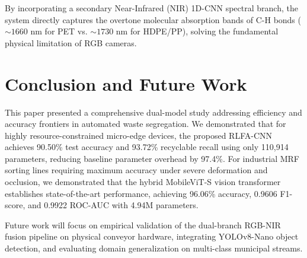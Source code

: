 \documentclass[conference]{IEEEtran}
\begin{document}
By incorporating a secondary Near-Infrared (NIR) 1D-CNN spectral branch, the system directly captures the overtone molecular absorption bands of $\text{C-H}$ bonds ($\sim 1660\text{ nm}$ for PET vs. $\sim 1730\text{ nm}$ for HDPE/PP), solving the fundamental physical limitation of RGB cameras.

\section{Conclusion and Future Work}
This paper presented a comprehensive dual-model study addressing efficiency and accuracy frontiers in automated waste segregation. We demonstrated that for highly resource-constrained micro-edge devices, the proposed RLFA-CNN achieves 90.50\% test accuracy and 93.72\% recyclable recall using only 110,914 parameters, reducing baseline parameter overhead by 97.4\%. For industrial MRF sorting lines requiring maximum accuracy under severe deformation and occlusion, we demonstrated that the hybrid MobileViT-S vision transformer establishes state-of-the-art performance, achieving 96.06\% accuracy, 0.9606 F1-score, and 0.9922 ROC-AUC with 4.94M parameters.

Future work will focus on empirical validation of the dual-branch RGB-NIR fusion pipeline on physical conveyor hardware, integrating YOLOv8-Nano object detection, and evaluating domain generalization on multi-class municipal streams.
\end{document}

